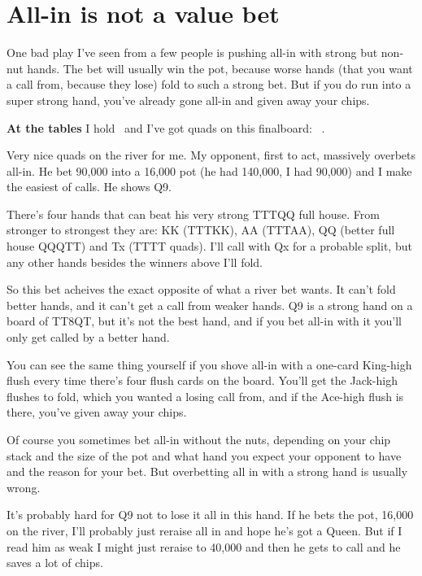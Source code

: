\chapter{All-in is not a value bet}



One bad play I've seen from a few people is pushing all-in
with strong but non-nut hands. The bet will usually win the
pot, because worse hands (that you want a call from, because they
lose) fold to such a strong bet. But if you do run
into a super strong hand, you've already gone all-in and given
away your chips.

\textbf{At the tables} I hold \Jh\tens\ and I've got quads on this
finalboard: \tenh\tenc\eigh\Qd\tend\ .

Very nice quads on the river for me. My opponent, first to act,
massively overbets all-in. He bet 90,000 into a 16,000 pot (he had
140,000, I had 90,000) and I make the easiest of calls. He shows Q9.

There's four hands that can beat his very strong TTTQQ full house.
From stronger to strongest they are: KK (TTTKK), AA (TTTAA), QQ
(better full house QQQTT) and Tx (TTTT quads). I'll call with Qx for a
probable split, but any other hands besides the winners above I'll
fold.

So this bet acheives the exact opposite of what a river bet wants.
It can't fold better hands, and it can't get a call from weaker hands.
Q9 is a strong hand on a board of TT8QT, but it's not the best hand,
and if you bet all-in with it you'll only get called by a better hand.

You can see the same thing yourself if you shove all-in with a
one-card King-high flush every time there's four flush cards on the
board. You'll get the Jack-high flushes to fold, which you
wanted a losing call from, and if the Ace-high flush is there,
you've given away your chips.

Of course you sometimes bet all-in without the nuts, depending on
your chip stack and the size of the pot and what hand you expect
your opponent to have and the reason for your bet. But overbetting
all in with a strong hand is usually wrong.

It's probably hard for Q9 not to lose it all in this hand. If he bets
the pot, 16,000 on the river, I'll probably just reraise all in and hope
he's got a Queen. But if I read him as weak I might just reraise to
40,000 and then he gets to call and he saves a lot of chips.
